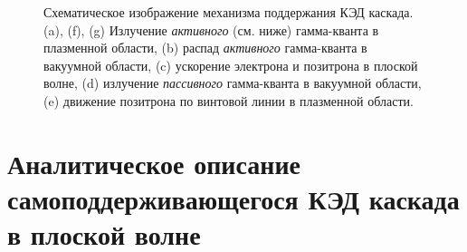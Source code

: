 \begin{figure}[ht]
    \caption[Механизм поддержания КЭД каскада в плоской волне]{
    Схематическое изображение механизма поддержания КЭД каскада. (a), (f), (g) Излучение \textit{активного} (см. ниже) гамма-кванта в плазменной области, (b) распад \textit{активного} гамма-кванта в вакуумной области, (c) ускорение электрона и позитрона в плоской волне, (d) излучение \textit{пассивного} гамма-кванта в вакуумной области, (e) движение позитрона по винтовой линии в плазменной области.}
    \label{fig:ch2/sec2/scheme}
\end{figure}

\section{Аналитическое описание самоподдерживающегося КЭД каскада в плоской волне}
\label{sec:ch2/sec3}

